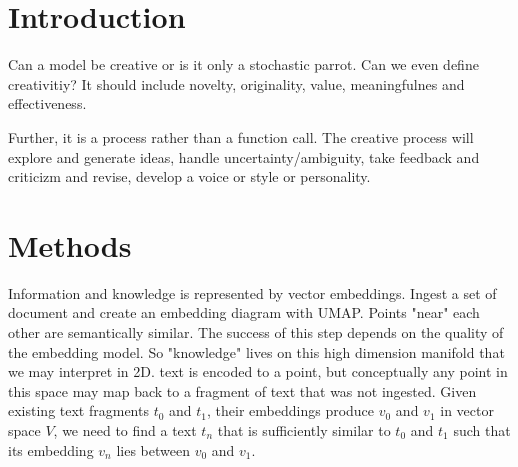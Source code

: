 \documentclass[twocolumn]{article}
\begin{document}


\section{Introduction}
Can a model be creative or is it only a stochastic parrot.   Can we even define creativitiy?   It should include novelty, originality, value, meaningfulnes and effectiveness.

Further, it is a process rather than a function call.  The creative process will explore and generate ideas, handle uncertainty/ambiguity, take feedback and criticizm and revise, develop
a voice or style or personality. 

\section{Methods}
Information and knowledge is represented by vector embeddings.  Ingest a set of document and create an embedding diagram with UMAP.   Points "near" each other are semantically similar.  The success of 
this step depends on the quality of the embedding model.   So "knowledge" lives on this high dimension manifold that we may interpret in 2D.  text is encoded to a point, but conceptually any point in this space 
may map back to a fragment of text that was not ingested.   Given existing text fragments \( t_0 \) and \( t_1 \), their embeddings produce \( v_0 \) and \( v_1 \) in vector space \( V \), we need to find 
a text \( t_n \) that is sufficiently similar to \( t_0 \) and \( t_1 \) such that its embedding \( v_n \) lies between \( v_0 \) and \( v_1 \).
\end{document}
